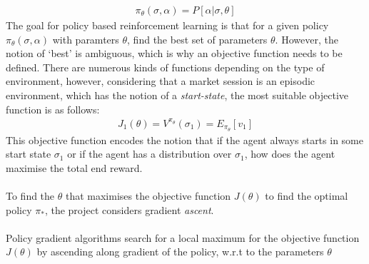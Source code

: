 \documentclass[ %
                    author={Ashwinder Khurana},
                supervisor={Prof Dave Cliff},
                    degree={MEng},
                     title={The Deeply Reinforced Trader},
                  subtitle={},
                      type={enterprise},
                      year={2020} ]{dissertation}
\begin{document}
{\begin{equation}
\label{Policy Gradient}
\begin{split}
\pi_\theta(\sigma, \alpha) = P[\alpha | \sigma, \theta]
\end{split}
\end{equation}
\noindent
The goal for policy based reinforcement learning is that for a given policy $\pi_\theta(\sigma,\alpha)$ with paramters $\theta$, find the best set of parameters $\theta$. However, the notion of \enquote*{best} is ambiguous, which is why an objective function needs to be defined. There are numerous kinds of functions depending on the type of environment, however, considering that a market session is an episodic environment, which has the notion of a \textit{start-state}, the most suitable objective function is as follows: 
\begin{equation}
\label{Policy Gradient}
\begin{split}
J_1(\theta) = V^{\pi_\theta}(\sigma_1) = E_{\pi_\theta} [v_1]
\end{split}
\end{equation}
\noindent
This objective function encodes the notion that if the agent always starts in some start state $\sigma_1$ or if the agent has a distribution over $\sigma_1$, how does the agent maximise the total end reward.
\\
\\
To find the $\theta$ that maximises the objective function $J(\theta)$ to find the optimal policy $\pi_*$, the project considers gradient \textit{ascent}. 
\\
\\
Policy gradient algorithms search for a local maximum for the objective function $J(\theta)$ by ascending along gradient of the policy, w.r.t to the parameters $\theta$ 

}
\end{document}
